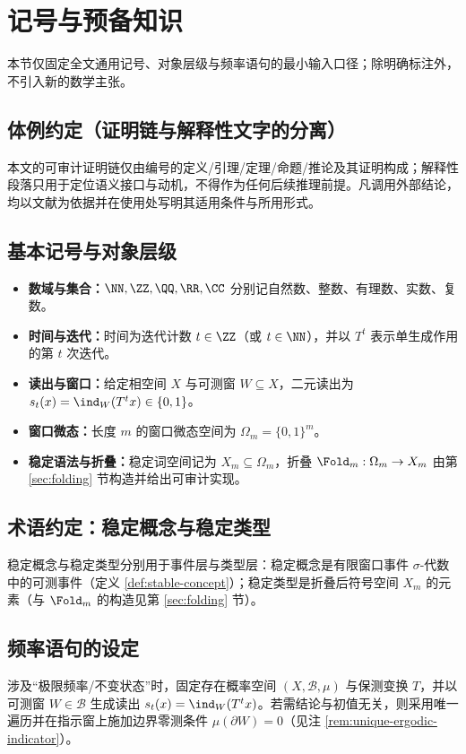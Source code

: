 \section{记号与预备知识}\label{sec:preliminaries}

本节仅固定全文通用记号、对象层级与频率语句的最小输入口径；除明确标注外，不引入新的数学主张。

\subsection{体例约定（证明链与解释性文字的分离）}\label{subsec:writing-conventions}
本文的可审计证明链仅由编号的定义/引理/定理/命题/推论及其证明构成；解释性段落只用于定位语义接口与动机，不得作为任何后续推理前提。凡调用外部结论，均以文献为依据并在使用处写明其适用条件与所用形式。

\subsection{基本记号与对象层级}
\begin{itemize}
  \item \textbf{数域与集合：}\(\NN,\ZZ,\QQ,\RR,\CC\) 分别记自然数、整数、有理数、实数、复数。
  \item \textbf{时间与迭代：}时间为迭代计数 \(t\in\ZZ\)（或 \(t\in\NN\)），并以 \(T^t\) 表示单生成作用的第 \(t\) 次迭代。
  \item \textbf{读出与窗口：}给定相空间 \(X\) 与可测窗 \(W\subseteq X\)，二元读出为 \(s_t(x)=\ind_W(T^t x)\in\{0,1\}\)。
  \item \textbf{窗口微态：}长度 \(m\) 的窗口微态空间为 \(\Omega_m=\{0,1\}^m\)。
  \item \textbf{稳定语法与折叠：}稳定词空间记为 \(X_m\subseteq\Omega_m\)，折叠 \(\Fold_m:\Omega_m\to X_m\) 由第 \ref{sec:folding} 节构造并给出可审计实现。
\end{itemize}

\subsection{术语约定：稳定概念与稳定类型}
稳定概念与稳定类型分别用于事件层与类型层：稳定概念是有限窗口事件 \(\sigma\)-代数中的可测事件（定义 \ref{def:stable-concept}）；稳定类型是折叠后符号空间 \(X_m\) 的元素（与 \(\Fold_m\) 的构造见第 \ref{sec:folding} 节）。

\subsection{频率语句的设定}\label{subsec:freq-setting}
涉及“极限频率/不变状态”时，固定存在概率空间 \((X,\mathcal{B},\mu)\) 与保测变换 \(T\)，并以可测窗 \(W\in\mathcal{B}\) 生成读出 \(s_t(x)=\ind_W(T^t x)\)。若需结论与初值无关，则采用唯一遍历并在指示窗上施加边界零测条件 \(\mu(\partial W)=0\)（见注 \ref{rem:unique-ergodic-indicator}）。

